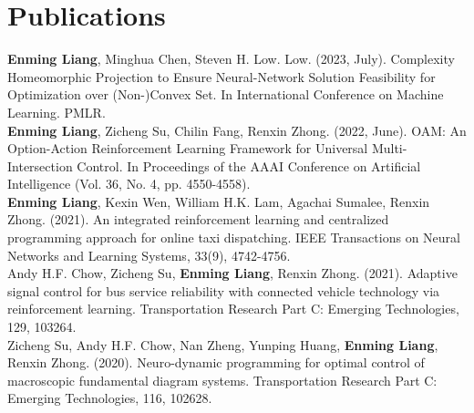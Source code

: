 \documentclass[letterpaper,11pt]{article}
\newcommand{\resumeSubHeadingListStart}{\begin{itemize}[leftmargin=0.15in, label={}]}
\newcommand{\resumeSubHeadingListEnd}{\end{itemize}}
\begin{document}
\section{Publications}
  \vspace{2pt}
  \resumeSubHeadingListStart
    \small{\item{
      {\textbf{Enming Liang}, Minghua Chen, Steven H. Low. Low. (2023, July). Complexity Homeomorphic Projection to Ensure Neural-Network Solution Feasibility for Optimization over (Non-)Convex Set. In International Conference on Machine Learning. PMLR.}\\ \vspace{3pt}
      {\textbf{Enming Liang}, Zicheng Su, Chilin Fang, Renxin Zhong. (2022, June). OAM: An Option-Action Reinforcement Learning Framework for Universal Multi-Intersection Control. In Proceedings of the AAAI Conference on Artificial Intelligence (Vol. 36, No. 4, pp. 4550-4558).}\\ \vspace{3pt}
      {\textbf{Enming Liang}, Kexin Wen, William H.K. Lam, Agachai Sumalee, Renxin Zhong. (2021). An integrated reinforcement learning and centralized programming approach for online taxi dispatching. IEEE Transactions on Neural Networks and Learning Systems, 33(9), 4742-4756.} \\ \vspace{3pt}
      {Andy H.F. Chow, Zicheng Su, \textbf{Enming Liang}, Renxin Zhong. (2021). Adaptive signal control for bus service reliability with connected vehicle technology via reinforcement learning. Transportation Research Part C: Emerging Technologies, 129, 103264.} \\ \vspace{3pt}
      {Zicheng Su, Andy H.F. Chow, Nan Zheng, Yunping Huang, \textbf{Enming Liang}, Renxin Zhong. (2020). Neuro-dynamic programming for optimal control of macroscopic fundamental diagram systems. Transportation Research Part C: Emerging Technologies, 116, 102628.} \\ \vspace{3pt}
    }}
  \resumeSubHeadingListEnd



\end{document}
